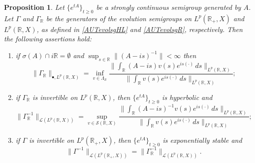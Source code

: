 \documentclass[10pt,psamsfonts,leqno]{siamltex}
\newtheorem{prop}{Proposition}[section]
\newcommand{\bbR}{\mathbb{R}}
\newcommand{\calS}{\mathcal{S}}
\newcommand{\lb}{\label}
\newcommand{\LpR}{{L^p(\bbR,X)}}
\newcommand{\LpRp}{{L^p(\bbR_+,X)}}
\newcommand{\LpRX}{{L^p(\bbR_+,X)}}
\begin{document}
\begin{prop}\lb{GammaRnorm}
Let $\{e^{tA}\}_{t\ge0}$ be a strongly continuous
semigroup generated by $A$.  Let
$\Gamma$ and $\Gamma_\bbR$ be the  generators of the
evolution semigroups on $\LpRp$ and $\LpR$, as defined in
\eqref{AUTevolsgHL} and \eqref{AUTevolsgR}, respectively.
 Then the following assertions hold:
\begin{enumerate}
\item if $\sigma(A)\cap i\bbR=\emptyset$ and
$\sup_{s\in{\mathbb R}}\|(A-is)^{-1}\|<\infty$
then $$\|\Gamma_\bbR\|_{\bullet,L^p(\bbR,X)}
=\inf_{v\in\Lambda_{\mathcal S}}
 \frac{\|\int_\bbR(A-is)v(s)e^{is(\cdot)}\,ds \| _\LpR}
 {\|\int_\bbR v(s)e^{is(\cdot)}\, ds\| _\LpR};$$
\item if $\Gamma_\bbR$ is invertible on $\LpR$, then
$\{e^{tA}\}_{t\ge0}$ is hyperbolic and
\begin{equation*}
\|\Gamma_\bbR^{-1}\|_{\mathcal{L}(\LpR)}=\sup_{v\in
\calS(\bbR,X)}\frac{\|\int_\bbR (A-is)^{-1}v(s)e^{is(\cdot)}\, ds \|
_\LpR}{\|
\int_\bbR v(s)e^{is(\cdot)}\, ds \| _\LpR};
\end{equation*}
\item if $\Gamma$ is invertible on $\LpRX$, then $\{e^{tA}\}_{t\ge 0}$
is
exponentially stable and $$\| \Gamma^{-1} \|_{\mathcal{L}(\LpRp)} =
\| \Gamma^{-1}_\bbR \|_{\mathcal{L}(\LpR)}.$$
\end{enumerate}
\end{prop}
\end{document}

